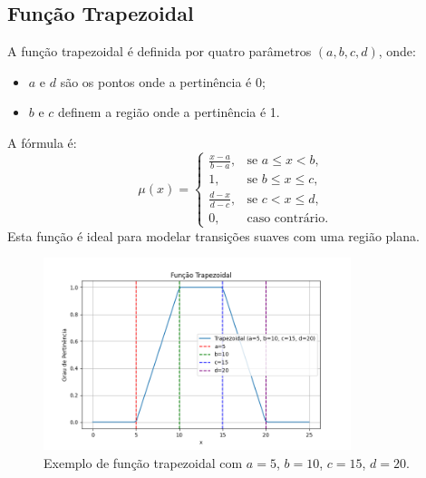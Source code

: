 \documentclass[a4paper,12pt]{article}
\begin{document}
\subsection{Função Trapezoidal}
A função trapezoidal é definida por quatro parâmetros $(a, b, c, d)$, onde:
\begin{itemize}
    \item $a$ e $d$ são os pontos onde a pertinência é 0;
    \item $b$ e $c$ definem a região onde a pertinência é 1.
\end{itemize}
A fórmula é:
\[
\mu(x) =
\begin{cases}
\frac{x - a}{b - a}, & \text{se } a \leq x < b, \\
1, & \text{se } b \leq x \leq c, \\
\frac{d - x}{d - c}, & \text{se } c < x \leq d, \\
0, & \text{caso contrário.}
\end{cases}
\]
Esta função é ideal para modelar transições suaves com uma região plana.
\begin{figure}[H]
    \centering
    \includegraphics[width=0.8\textwidth]{img/trapezoidal.png}
    \caption{Exemplo de função trapezoidal com $a=5$, $b=10$, $c=15$, $d=20$.}
\end{figure}
\end{document}
